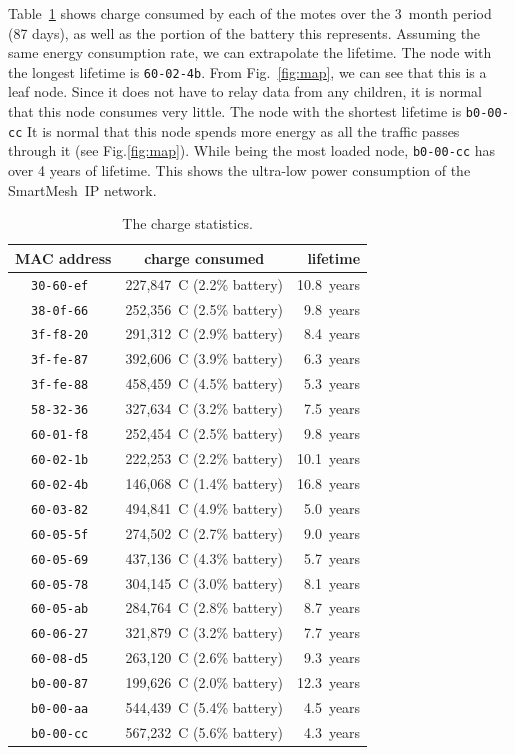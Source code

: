 \documentclass{sig-alternate}
\newcommand{\smip}                {SmartMesh~IP\xspace}
\begin{document}

Table~\ref{tab:stats_charge} shows charge consumed by each of the motes over the 3~month period (87 days), as well as the portion of the battery this represents.
Assuming the same energy consumption rate, we can extrapolate the lifetime.
The node with the longest lifetime is {\tt 60-02-4b}.
From Fig.~\ref{fig:map}, we can see that this is a leaf node.
Since it does not have to relay data from any children, it is normal that this node consumes very little.
The node with the shortest lifetime is {\tt b0-00-cc} 
It is normal that this node spends more energy as all the traffic passes through it (see Fig.\ref{fig:map}).
While being the most loaded node, {\tt b0-00-cc} has over 4 years of lifetime.
This shows the ultra-low power consumption of the \smip network.

\begin{table}
  \begin{tabular}{|c|c|r|}
     \hline
     MAC address    & charge consumed           &   lifetime \\
     \hline
     \tt{30-60-ef}  & 227,847~C (2.2\% battery) & 10.8~years \\
     \tt{38-0f-66}  & 252,356~C (2.5\% battery) &  9.8~years \\
     \tt{3f-f8-20}  & 291,312~C (2.9\% battery) &  8.4~years \\
     \tt{3f-fe-87}  & 392,606~C (3.9\% battery) &  6.3~years \\
     \tt{3f-fe-88}  & 458,459~C (4.5\% battery) &  5.3~years \\
     \tt{58-32-36}  & 327,634~C (3.2\% battery) &  7.5~years \\
     \tt{60-01-f8}  & 252,454~C (2.5\% battery) &  9.8~years \\
     \tt{60-02-1b}  & 222,253~C (2.2\% battery) & 10.1~years \\
     \tt{60-02-4b}  & 146,068~C (1.4\% battery) & 16.8~years \\
     \tt{60-03-82}  & 494,841~C (4.9\% battery) &  5.0~years \\
     \tt{60-05-5f}  & 274,502~C (2.7\% battery) &  9.0~years \\
     \tt{60-05-69}  & 437,136~C (4.3\% battery) &  5.7~years \\
     \tt{60-05-78}  & 304,145~C (3.0\% battery) &  8.1~years \\
     \tt{60-05-ab}  & 284,764~C (2.8\% battery) &  8.7~years \\
     \tt{60-06-27}  & 321,879~C (3.2\% battery) &  7.7~years \\
     \tt{60-08-d5}  & 263,120~C (2.6\% battery) &  9.3~years \\
     \tt{b0-00-87}  & 199,626~C (2.0\% battery) & 12.3~years \\
     \tt{b0-00-aa}  & 544,439~C (5.4\% battery) &  4.5~years \\
     \tt{b0-00-cc}  & 567,232~C (5.6\% battery) &  4.3~years \\
     \hline
  \end{tabular}
  \caption{The charge statistics.}
  \label{tab:stats_charge}
\end{table}
\end{document}
